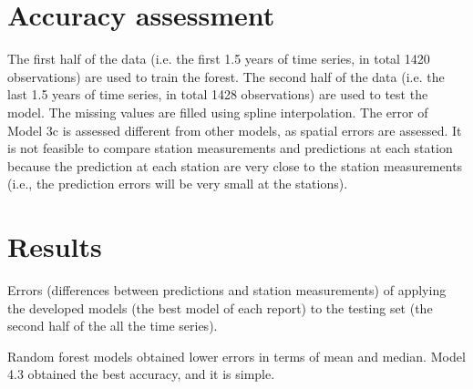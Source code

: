 \documentclass{article}
\begin{document}


 

\section{Accuracy assessment}

The first half of the data (i.e. the first 1.5 years of time series,
in total 1420 observations) are used to train the forest. The second
half of the data (i.e. the last 1.5 years of time series, in total
1428 observations) are used to test the model. The missing values are
filled using spline interpolation.   The error of Model 3c is
assessed different from other models, as spatial errors are
assessed. It is not feasible to compare station measurements and
predictions at each station because the prediction at each station are
very close to the station measurements (i.e., the prediction errors
will be very small at the stations).


\section{Results}

Errors (differences between predictions and station measurements)
of applying the developed models (the best model of each
report) to the
testing set (the second half of the all the time series). 

Random
forest models obtained lower errors in terms of mean and median. Model
4.3 obtained the best accuracy, and it is simple.
\end{document}
